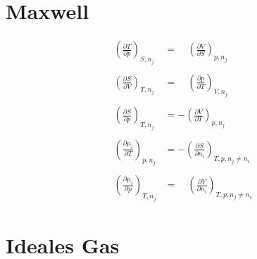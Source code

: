 \documentclass[twocolumn]{article}
\begin{document}
\section{Maxwell}

\begin{align*}
	\left(\frac{\partial T}{\partial p}\right)_{S,n_j}
	&= \quad
	\left(\frac{\partial V}{\partial S}\right)_{p,n_j}
	\\\\
	\left(\frac{\partial S}{\partial V}\right)_{T,n_j}
	&= \quad
	\left(\frac{\partial p}{\partial T}\right)_{V,n_j}
	\\\\
	\left(\frac{\partial S}{\partial p}\right)_{T,n_j}
	&= -
	\left(\frac{\partial V}{\partial T}\right)_{p,n_j}
	\\\\
	\left(\frac{\partial \mu _i}{\partial T}\right)_{p,n_j}
	&= -
	\left(\frac{\partial S}{\partial n_i}\right)_{T,p,n_j \neq n_i}
	\\\\
	\left(\frac{\partial \mu_i}{\partial p}\right)_{T,n_j}
	&=
	\quad \left(\frac{\partial V}{\partial n_i}\right)_{T,p,n_j \neq n_i}
\end{align*}

                                                        
\section{Ideales Gas}
\setlength{\belowdisplayskip}{-10pt} \setlength{\belowdisplayshortskip}{-10pt}
\end{document}
